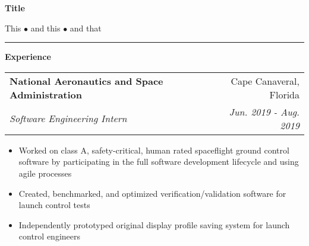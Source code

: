 \documentclass[letterpaper,11pt]{article}
\makeatletter
\newcommand{\resitem}[1]{\item #1 \vspace{-3pt}}
\newcommand{\colfill}{@{\extracolsep{\fill}}}
\newcommand{\ressubheading}[4]{
\begin{tabular*}{6.5in}{l\colfill r}
		\textbf{#1} & #2 \\
		\textit{#3} & \textit{#4} \\
\end{tabular*}\vspace{-6pt}}
\newcommand{\ressection}[2]
{
\begin{minipage}[t]{0.1\textwidth}
    \textbf{#1}
\end{minipage}
\hspace{0.04\textwidth}
\begin{minipage}[t]{0.8\textwidth}
    #2
\end{minipage}
}
\makeatother
\begin{document}
\begin{center}
\textbf{\Large Title}
\end{center}
\vspace{-1.5\baselineskip}
\begin{center}
    This $\bullet$ and this $\bullet$ and that
\end{center}
\vspace{-1.5\baselineskip}
\rule{1.0\textwidth}{1.5pt}
\vspace{0.1\baselineskip}
\newline
\ressection{Experience}
{\ressubheading{National Aeronautics and Space Administration}{Cape Canaveral, Florida}{Software Engineering Intern}{Jun. 2019 - Aug. 2019}
\begin{itemize}
	\resitem{Worked on class A, safety-critical, human rated spaceflight ground control software by participating in the full software development lifecycle and using agile processes}
     \resitem{Created, benchmarked, and optimized verification/validation software for launch control tests}
	\resitem{Independently prototyped original display profile saving system for launch control engineers}
\end{itemize}}
\end{document}
